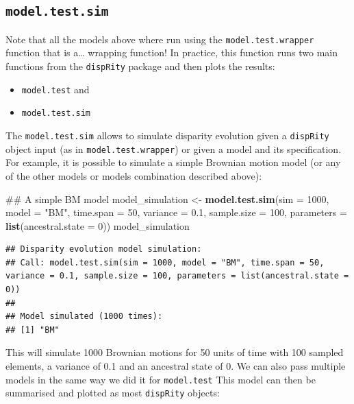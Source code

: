 \documentclass[]{book}
\newenvironment{Shaded}{\begin{snugshade}}{\end{snugshade}}
\newcommand{\KeywordTok}[1]{\textcolor[rgb]{0.13,0.29,0.53}{\textbf{#1}}}
\newcommand{\DataTypeTok}[1]{\textcolor[rgb]{0.13,0.29,0.53}{#1}}
\newcommand{\DecValTok}[1]{\textcolor[rgb]{0.00,0.00,0.81}{#1}}
\newcommand{\FloatTok}[1]{\textcolor[rgb]{0.00,0.00,0.81}{#1}}
\newcommand{\StringTok}[1]{\textcolor[rgb]{0.31,0.60,0.02}{#1}}
\newcommand{\NormalTok}[1]{#1}
\providecommand{\tightlist}{%
  \setlength{\itemsep}{0pt}\setlength{\parskip}{0pt}}
\theoremstyle{definition}
\theoremstyle{definition}
\theoremstyle{definition}
\theoremstyle{remark}
\begin{document}
\subsection{\texorpdfstring{\texttt{model.test.sim}}{model.test.sim}}\label{model.test.sim}

Note that all the models above where run using the
\texttt{model.test.wrapper} function that is a\ldots{} wrapping
function! In practice, this function runs two main functions from the
\texttt{dispRity} package and then plots the results:

\begin{itemize}
\tightlist
\item
  \texttt{model.test} and
\item
  \texttt{model.test.sim}
\end{itemize}

The \texttt{model.test.sim} allows to simulate disparity evolution given
a \texttt{dispRity} object input (as in \texttt{model.test.wrapper}) or
given a model and its specification. For example, it is possible to
simulate a simple Brownian motion model (or any of the other models or
models combination described above):

\begin{Shaded}
\begin{Highlighting}[]
\NormalTok{## A simple BM model}
\NormalTok{model_simulation <-}\StringTok{ }\KeywordTok{model.test.sim}\NormalTok{(}\DataTypeTok{sim =} \DecValTok{1000}\NormalTok{, }\DataTypeTok{model =} \StringTok{"BM"}\NormalTok{, }\DataTypeTok{time.span =} \DecValTok{50}\NormalTok{, }\DataTypeTok{variance =} \FloatTok{0.1}\NormalTok{,}
                                   \DataTypeTok{sample.size =} \DecValTok{100}\NormalTok{, }\DataTypeTok{parameters =} \KeywordTok{list}\NormalTok{(}\DataTypeTok{ancestral.state =} \DecValTok{0}\NormalTok{))}
\NormalTok{model_simulation}
\end{Highlighting}
\end{Shaded}

\begin{verbatim}
## Disparity evolution model simulation:
## Call: model.test.sim(sim = 1000, model = "BM", time.span = 50, variance = 0.1, sample.size = 100, parameters = list(ancestral.state = 0)) 
## 
## Model simulated (1000 times):
## [1] "BM"
\end{verbatim}

This will simulate 1000 Brownian motions for 50 units of time with 100
sampled elements, a variance of 0.1 and an ancestral state of 0. We can
also pass multiple models in the same way we did it for
\texttt{model.test} This model can then be summarised and plotted as
most \texttt{dispRity} objects:
\end{document}
